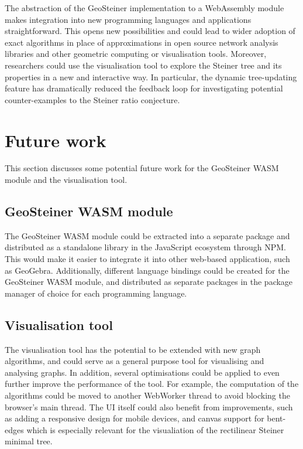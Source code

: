 \documentclass{l4proj}
\begin{document}
The abstraction of the GeoSteiner implementation to a WebAssembly module makes integration into new programming languages and applications straightforward. This opens new possibilities and could lead to wider adoption of exact algorithms in place of approximations in open source network analysis libraries and other geometric computing or visualisation tools.
Moreover, researchers could use the visualisation tool to explore the Steiner tree and its properties in a new and interactive way. In particular, the dynamic tree-updating feature has dramatically reduced the feedback loop for investigating potential counter-examples to the Steiner ratio conjecture.

\section{Future work}
This section discusses some potential future work for the GeoSteiner WASM module and the visualisation tool.

\subsection{GeoSteiner WASM module}
The GeoSteiner WASM module could be extracted into a separate package and distributed as a standalone library in the JavaScript ecosystem through NPM. This would make it easier to integrate it into other web-based application, such as GeoGebra. Additionally, different language bindings could be created for the GeoSteiner WASM module, and distributed as separate packages in the package manager of choice for each programming language.

\subsection{Visualisation tool}
The visualisation tool has the potential to be extended with new graph algorithms, and could serve as a general purpose tool for visualising and analysing graphs.
In addition, several optimisations could be applied to even further improve the performance of the tool. For example, the computation of the algorithms could be moved to another WebWorker thread to avoid blocking the browser's main thread.
The UI itself could also benefit from improvements, such as adding a responsive design for mobile devices, and canvas support for bent-edges which is especially relevant for the visualiation of the rectilinear Steiner minimal tree.
\end{document}
